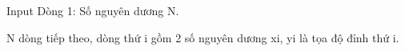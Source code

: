 Input
Dòng 1: Số nguyên dương N.  

   N dòng tiếp theo, dòng thứ i gồm 2 số nguyên dương xi, yi là tọa độ đỉnh thứ i.